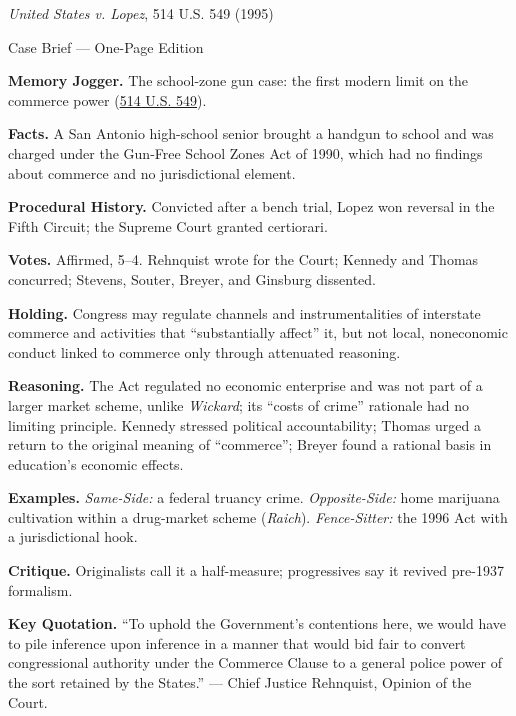 \documentclass[12pt]{article}
\begin{document}
\begin{center}
{\Large \textit{United States v. Lopez}, 514 U.S. 549 (1995)\par}
\vspace{0.3em}
{\normalsize Case Brief --- One-Page Edition\par}
\end{center}

\textbf{Memory Jogger.} The school-zone gun case: the first modern limit on the commerce power (\href{https://www.courtlistener.com/opinion/117927/united-states-v-lopez/}{514 U.S. 549}).

\textbf{Facts.} A San Antonio high-school senior brought a handgun to school and was charged under the Gun-Free School Zones Act of 1990, which had no findings about commerce and no jurisdictional element.

\textbf{Procedural History.} Convicted after a bench trial, Lopez won reversal in the Fifth Circuit; the Supreme Court granted certiorari.

\textbf{Votes.} Affirmed, 5--4. Rehnquist wrote for the Court; Kennedy and Thomas concurred; Stevens, Souter, Breyer, and Ginsburg dissented.

\textbf{Holding.} Congress may regulate channels and instrumentalities of interstate commerce and activities that ``substantially affect'' it, but not local, noneconomic conduct linked to commerce only through attenuated reasoning.

\textbf{Reasoning.} The Act regulated no economic enterprise and was not part of a larger market scheme, unlike \textit{Wickard}; its ``costs of crime'' rationale had no limiting principle. Kennedy stressed political accountability; Thomas urged a return to the original meaning of ``commerce''; Breyer found a rational basis in education's economic effects.

\textbf{Examples.} \emph{Same-Side:} a federal truancy crime. \emph{Opposite-Side:} home marijuana cultivation within a drug-market scheme (\textit{Raich}). \emph{Fence-Sitter:} the 1996 Act with a jurisdictional hook.

\textbf{Critique.} Originalists call it a half-measure; progressives say it revived pre-1937 formalism.

\textbf{Key Quotation.} ``To uphold the Government's contentions here, we would have to pile inference upon inference in a manner that would bid fair to convert congressional authority under the Commerce Clause to a general police power of the sort retained by the States.'' --- Chief Justice Rehnquist, Opinion of the Court.
\end{document}
